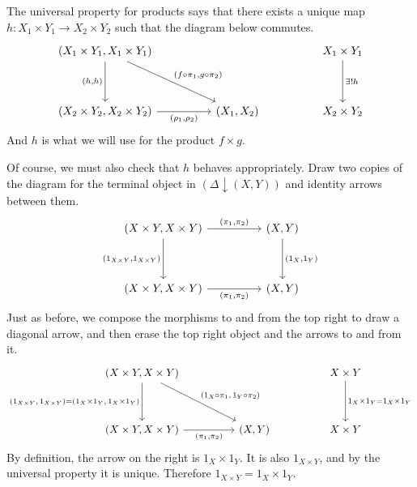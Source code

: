 \documentclass[a4paper]{report}
\theoremstyle{definition}
\theoremstyle{plain}
\theoremstyle{remark}
\begin{document}
The universal property for products says that there exists a unique map $h\colon X_{1}\times Y_{1} \to X_{2}\times Y_{2}$ such that the diagram below commutes.
\begin{equation*}
  \begin{tikzcd}[row sep=huge, column sep=huge]
    (X_{1} \times Y_{1}, X_{1} \times Y_{1}) \arrow[d, swap, "{(h, h)}"] \arrow[rd, "{(f \circ \pi_{1}, g \circ \pi_{2})}"] & & X_{1}\times Y_{1} \arrow[d, "\exists!h"]\\
    (X_{2}\times Y_{2}, X_{2}\times Y_{2}) \arrow[r, swap, "{(\rho_{1}, \rho_{2})}"] &  (X_{1}, X_{2})& X_{2}\times Y_{2}
  \end{tikzcd}
\end{equation*}
And $h$ is what we will use for the product $f \times g$.

Of course, we must also check that $h$ behaves appropriately. Draw two copies of the diagram for the terminal object in $(\Delta\downarrow (X,Y))$ and identity arrows between them.
\begin{equation*}
  \begin{tikzcd}[row sep=huge, column sep=huge]
    {(X\times Y, X \times Y)} \arrow[r, "{(\pi_{1}, \pi_{2})}"] \arrow[d, swap, "{(1_{X \times Y}, 1_{X \times Y})}"] & (X, Y) \arrow[d, "{(1_{X}, 1_{Y})}"] \\
    {(X\times Y, X \times Y)} \arrow[r, swap, "{(\pi_{1}, \pi_{2})}"] & (X, Y)
  \end{tikzcd}
\end{equation*}
Just as before, we compose the morphisms to and from the top right to draw a diagonal arrow, and then erase the top right object and the arrows to and from it.
\begin{equation*}
  \begin{tikzcd}[row sep=huge, column sep=huge]
    {(X\times Y, X \times Y)}  \arrow[d, swap, "{(1_{X \times Y},\, 1_{X \times Y}) = (1_{X}\times 1_{Y},\, 1_{X}\times 1_{Y})}"] \arrow[dr, "{(1_{X} \circ \pi_{1},\, 1_{Y} \circ \pi_{2})}"] & & X\times Y \arrow[d, "1_{X}\times1_{Y} = 1_{X}\times1_{Y}"] \\
    {(X\times Y, X \times Y)} \arrow[r, swap, "{(\pi_{1}, \pi_{2})}"] & (X, Y) & X\times Y
  \end{tikzcd}
\end{equation*}
By definition, the arrow on the right is $1_{X}\times1_{Y}$. It is also $1_{X\times Y}$, and by the universal property it is unique. Therefore $1_{X\times Y} = 1_{X}\times 1_{Y}$.
\end{document}
